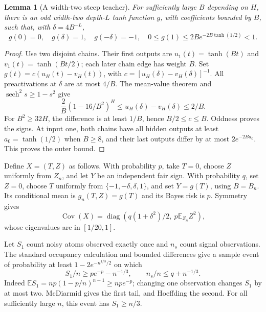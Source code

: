 \documentclass[11pt]{article}
\newtheorem{lemma}[theorem]{Lemma}
\newcommand{\E}{\mathbb E}\newcommand{\Pp}{\mathbb P}\newcommand{\R}{\mathbb R}
\begin{document}
\begin{lemma}[A width-two steep teacher]
\label{lem:teacher}
For sufficiently large $B$ depending on $H$, there is an odd width-two depth-$L$ tanh function $g$, with coefficients bounded by $B$, such that, with $\delta=4B^{-L}$,
\[
 g(0)=0,\quad g(\delta)=1,\quad g(-\delta)=-1,\quad
 0\le g(1)\le2B e^{-2B\tanh(1/2)}<1.
\]
\end{lemma}
\begin{proof}
Use two disjoint chains. Their first outputs are $u_1(t)=\tanh(Bt)$ and $v_1(t)=\tanh(Bt/2)$; each later chain edge has weight $B$. Set $g(t)=c(u_H(t)-v_H(t))$, with $c=[u_H(\delta)-v_H(\delta)]^{-1}$.
All preactivations at $\delta$ are at most $4/B$. The mean-value theorem and $\operatorname{sech}^2 s\ge1-s^2$ give
\[
 \frac2B(1-16/B^2)^H\le u_H(\delta)-v_H(\delta)\le2/B.
\]
For $B^2\ge32H$, the difference is at least $1/B$, hence $B/2\le c\le B$. Oddness proves the signs. At input one, both chains have all hidden outputs at least $a_0=\tanh(1/2)$ when $B\ge8$, and their last outputs differ by at most $2e^{-2Ba_0}$. This proves the outer bound.
\end{proof}

Define $X=(T,Z)$ as follows. With probability $p$, take $T=0$, choose $Z$ uniformly from $Z_n$, and let $Y$ be an independent fair sign. With probability $q$, set $Z=0$, choose $T$ uniformly from $\{-1,-\delta,\delta,1\}$, and set $Y=g(T)$, using $B=B_n$. Its conditional mean is $g_n(T,Z)=g(T)$ and its Bayes risk is $p$. Symmetry gives
\[
 \operatorname{Cov}(X)=\operatorname{diag}\left(q(1+\delta^2)/2,\ p\E_{Z_n} Z^2\right),
\]
whose eigenvalues are in $[1/20,1]$.

Let $S_1$ count noisy atoms observed exactly once and $n_s$ count signal observations. The standard occupancy calculation and bounded differences give a sample event of probability at least $1-2e^{-n^{1/3}/2}$ on which
\begin{equation}
 S_1/n\ge pe^{-p}-n^{-1/3},\qquad n_s/n\le q+n^{-1/3}.
 \label{eq:occupancy}
\end{equation}
Indeed $\E S_1=np(1-p/n)^{n-1}\ge npe^{-p}$; changing one observation changes $S_1$ by at most two. McDiarmid gives the first tail, and Hoeffding the second. For all sufficiently large $n$, this event has $S_1\ge n/3$.
\end{document}
